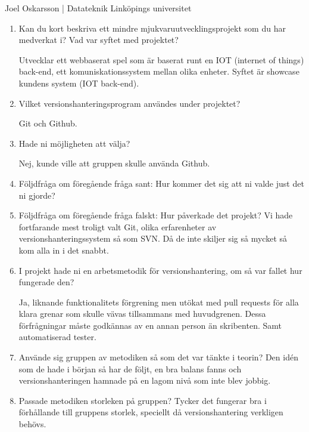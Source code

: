 \vspace{3em}
\begin{center}
    Joel Oskarsson | Datateknik Linköpings universitet
\end{center}
\begin{enumerate}

  \item Kan du kort beskriva ett mindre mjukvaruutvecklingsprojekt som du har medverkat i? Vad var syftet med projektet?

  Utvecklar ett webbaserat spel som är baserat runt en IOT (internet of things) back-end, ett komuniskationssystem mellan olika enheter. Syftet är showcase kundens system (IOT back-end).

  \item Vilket versionshanteringsprogram användes under projektet?

  Git och Github.

  \item Hade ni möjligheten att välja?

  Nej, kunde ville att gruppen skulle använda Github.

  \item Följdfråga om föregående fråga sant: Hur kommer det sig att ni valde just det ni gjorde?
  \item Följdfråga om föregående fråga falskt: Hur påverkade det projekt?
  Vi hade fortfarande mest troligt valt Git, olika erfarenheter av versionshanteringssystem så som SVN. Då de inte skiljer sig så mycket så kom alla in i det snabbt.

  \item I projekt hade ni en arbetsmetodik för versionshantering, om så var fallet hur fungerade den?

  Ja, liknande funktionalitets förgrening men utökat med pull requests för alla klara grenar som skulle vävas tillsammans med huvudgrenen. Dessa förfrågningar måste godkännas av en annan person än skribenten. Samt automatiserad tester.

  \item Använde sig gruppen av metodiken så som det var tänkte i teorin?
  Den idén som de hade i början så har de följt, en bra balans fanns och versionshanteringen hamnade på en lagom nivå som inte blev jobbig.

  \item Passade metodiken storleken på gruppen?
  Tycker det fungerar bra  i förhållande till gruppens storlek, speciellt då versionshantering verkligen behövs.


\end{enumerate}
